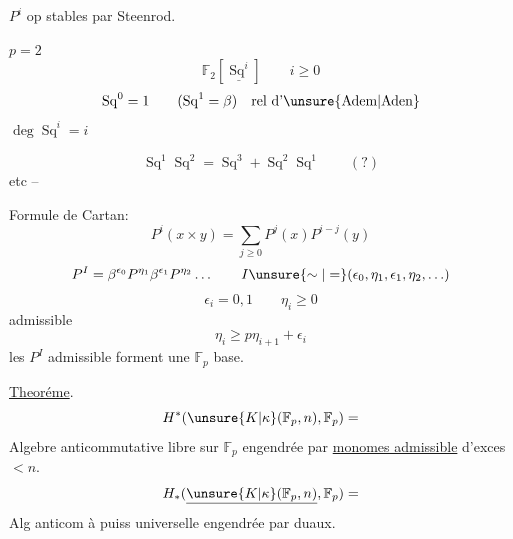 $P^i$ op stables  par Steenrod.

$p=2$
\[
\mathbb F_2[\underline{\operatorname{Sq}^i}]\qquad i\geq0
\]
\[
\operatorname{Sq}^0=1\qquad(\operatorname{Sq}^1=\beta)\quad\text{rel d'\unsure{Adem|Aden}}
\]
$\deg\operatorname{Sq}^i=i$

\[
\operatorname{Sq}^1\operatorname{Sq}^2=\operatorname{Sq}^3+\operatorname{Sq}^2\operatorname{Sq}^1\qquad(?)
\]
etc --

Formule de Cartan:
\[
P^i(x\times y)=\sum_{j\geq0}P^j(x)P^{i-j}(y)
\]
\[
P^I=\beta^{\epsilon_0}P^{\eta_1}\beta^{\epsilon_1}P^{\eta_2}\ldots
\qquad I\unsure{\sim|=}(\epsilon_0,\eta_1,\epsilon_1,\eta_2,\ldots)
\]
\[
\epsilon_i=0,1\qquad\eta_i\geq0
\]
admissible
\[
\eta_i\geq p\eta_{i+1}+\epsilon_i
\]
les $P^I$ admissible forment une $\mathbb F_p$ base.

\uline{Theoréme}.
\[
H^*(\unsure{K|\kappa}(\mathbb F_p,n),\mathbb F_p)=
\]
Algebre anticommutative libre sur $\mathbb F_p$ engendrée par  \uline{monomes admissible} d'exces $<n$.
\[
H_*(\underline{\unsure{K|\kappa}(\mathbb F_p,n)},\mathbb F_p)=
\]
Alg anticom à puiss  universelle engendrée par   duaux.
